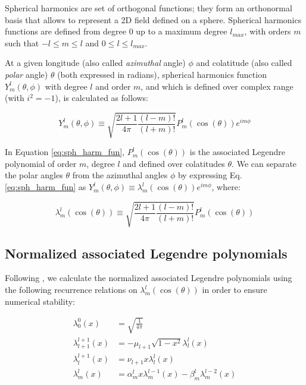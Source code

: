 Spherical harmonics are set of orthogonal functions; they form an orthonormal basis that allows to represent a 2D field defined on a sphere. Spherical harmonics functions are defined from degree 0 up to a maximum degree $l_{max}$, with orders $m$ such that $-l \leq m \leq l$ and $0 \leq l \leq l_{max}$.

At a given longitude (also called \emph{azimuthal} angle) $\phi$ and colatitude (also called \emph{polar} angle) $\theta$ (both expressed in radians), spherical harmonics function $Y_m^l(\theta, \phi)$ with degree $l$ and order $m$, and which is defined over complex range (with $i^2=-1$), is calculated as follows:

\begin{equation}
Y_m^l(\theta, \phi) \equiv \sqrt{\frac{2l+1}{4\pi} \frac{(l-m)!}{(l+m)!}}
 P_m^l(\cos(\theta))e^{im\phi}
\label{eq:sph_harm_fun}
\end{equation}

In Equation \ref{eq:sph_harm_fun}, $P_m^l(\cos(\theta))$ is the associated Legendre polynomial of order $m$, degree $l$ and defined over colatitudes $\theta$. We can separate the polar angles $\theta$ from the azimuthal angles $\phi$ by expressing Eq. \ref{eq:sph_harm_fun} as $Y_m^l(\theta, \phi) \equiv \lambda_m^l(\cos(\theta))e^{im\phi}$, where:

\begin{equation}
\lambda_m^l(\cos(\theta)) \equiv \sqrt{\frac{2l+1}{4\pi} \frac{(l-m)!}{(l+m)!}} P_m^l(\cos(\theta))
\label{eq:sph_harm_lambda}
\end{equation}

\subsection{Normalized associated Legendre polynomials}

Following \citet{willmert2020notes,willmert2019constraining}, we calculate the normalized associated Legendre polynomials using the following recurrence relations on $\lambda_m^l(\cos(\theta))$ in order to ensure numerical stability:

\begin{align}
\lambda_0^0(x) &=  \sqrt{\frac{1}{4\pi}} \\
\lambda_{l+1}^{l+1}(x) &= -\mu_{l+1} \sqrt{1-x^2}\lambda_l^l(x) \\
\lambda_l^{l+1}(x) &= \nu_{l+1} x \lambda_l^l(x) \\
\lambda_m^l(x) &= \alpha_m^l x \lambda_m^{l-1}(x) - \beta_m^l\lambda_m^{l-2}(x)
\end{align}

